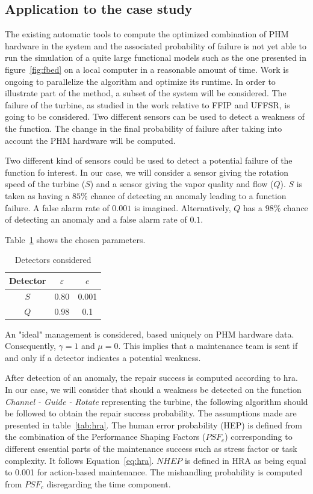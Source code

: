 \subsection{Application to the case study}

The existing automatic tools to compute the optimized combination of PHM hardware in the system and the associated probability of failure is not yet able to run the simulation of a quite large functional models such as the one presented in figure~\ref{fig:fbed} on a local computer in a reasonable amount of time. Work is ongoing to parallelize the algorithm and optimize its runtime. In order to illustrate part of the method, a subset of the system will be considered. The failure of the turbine, as studied in the work relative to FFIP and UFFSR, is going to be considered. Two different sensors can be used to detect a weakness of the function. The change in the final probability of failure after taking into account the PHM hardware will be computed.

Two different kind of sensors could be used to detect a potential failure of the function fo interest. In our case, we will consider a sensor giving the rotation speed of the turbine ($S$) and a sensor giving the vapor quality and flow ($Q$). $S$ is taken as having a $85\%$ chance of detecting an anomaly leading to a function failure. A false alarm rate of $0.001$ is imagined. Alternatively, $Q$ has a $98\%$ chance of detecting an anomaly and a false alarm rate of $0.1$.

Table~\ref{tab:astrid_det} shows the chosen parameters.

\begin{table}[t]
\centering
\caption{Detectors considered}
\label{tab:astrid_det}
\begin{tabular}{|c|c|c|}
\hline
Detector & $\varepsilon$ & $e$   \\ \hline
$S$      & 0.80          & 0.001 \\ \hline
$Q$      & 0.98          & 0.1   \\ \hline
\end{tabular}
\end{table}

An "ideal" management is considered, based uniquely on PHM hardware data. Consequently, $\gamma = 1$ and $\mu = 0$. This implies that a maintenance team is sent if and only if a detector indicates a potential weakness.

After detection of an anomaly, the repair success is computed according to \gls{hra}. In our case, we will consider that should a weakness be detected on the function \textit{Channel - Guide - Rotate} representing the turbine, the following algorithm should be followed to obtain the repair success probability. The assumptions made are presented in table~\ref{tab:hra}. The human error probability (HEP) is defined from the combination of the Performance Shaping Factors ($PSF_c$) corresponding to different essential parts of the maintenance success such as stress factor or task complexity. It follows Equation~\ref{eq:hra}. $NHEP$ is defined in HRA as being equal to 0.001 for action-based maintenance. The mishandling probability is computed from $PSF_c$ disregarding the time component.

